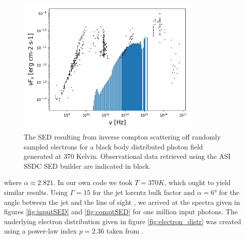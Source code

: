 \documentclass{article}
\begin{document}
    \begin{figure}[p]
        \centering
        \includegraphics[width=0.8\textwidth]{3C454_3_comptSED.png}
        \caption{The SED resulting from inverse compton scattering off randomly sampled electrons for a black body distributed photon field generated at 370 Kelvin. Observational data retrieved using the ASI SSDC SED builder are indicated in black.} 
    \end{figure}
    \label{fig:comptSED}
    
    where $\alpha \approx 2.821$. In our own code we took $T=370 K$, which ought to yield similar results. Using $\Gamma=15$ for the jet lorentz bulk factor and $\alpha=\ang{6}$ for the angle between the jet and the line of sight \cite{Gupta2017}, we arrived at the spectra given in figures \ref{fig:inputSED} and \ref{fig:comptSED} for one million input photons. The underlying electron distribution given in figure \ref{fig:electron_distr} was created using a power-law index $p=2.36$ taken from \cite{Gupta2017}.
\end{document}
